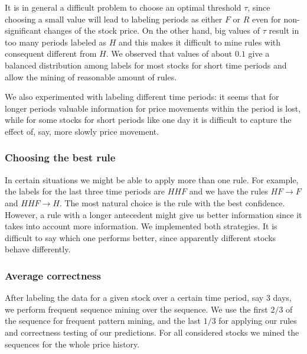 \documentclass{llncs}
\begin{document}
It is in general a difficult problem to choose an optimal threshold $\tau$, since choosing a small value will lead to labeling periods as either $F$ or $R$ even for non-significant changes of the stock price. On the other hand, big values of $\tau$ result in too many periods labeled as $H$ and this makes it difficult to mine rules with consequent different from $H$.  We observed that values of about $0.1$ give a balanced distribution among labels for most stocks for short time periods and allow the mining of reasonable amount of rules. 

We also experimented with labeling different time periods: it seems that for longer periods valuable information for price movements within the period is lost, while for some stocks for short periods like one day it is difficult to capture the effect of, say, more slowly price movement.  

\subsubsection{Choosing the best rule}
In certain situations we might be able to apply more than one rule. For example, the labels for the last three time periods are $HHF$ and we have the rules $HF \rightarrow F$ and $HHF \rightarrow H$. The most natural choice is the rule with the best confidence. However, a rule with a longer antecedent might give us better information since it takes into account more information. We implemented both strategies. It is difficult to say which one performs better, since apparently different stocks behave differently.  

\subsubsection{Average correctness}

After labeling the data for a given stock over a certain time period, say 3 days, we perform frequent sequence mining over the sequence. We use the first $2/3$ of the sequence for frequent pattern mining, and the last $1/3$ for applying our rules and correctness testing of our predictions. For all considered stocks we mined the sequences for the whole price history. 
\end{document}
